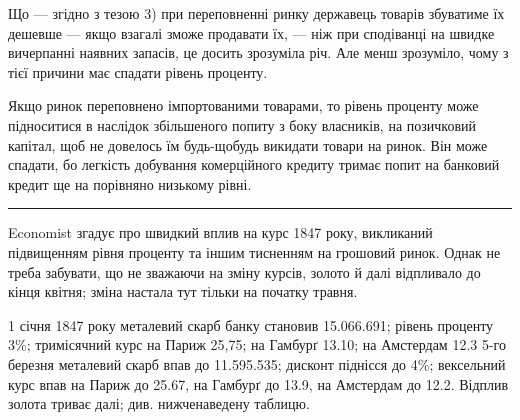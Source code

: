 
Що — згідно з тезою 3) при переповненні ринку державець товарів збуватиме
їх дешевше — якщо взагалі зможе продавати їх, — ніж при сподіванці на
швидке вичерпанні наявних запасів, це досить зрозуміла річ. Але менш зрозуміло,
чому з тієї причини має спадати рівень проценту.

Якщо ринок переповнено імпортованими товарами, то рівень проценту може
підноситися в наслідок збільшеного попиту з боку власників, на позичковий
капітал, щоб не довелось їм будь-щобудь викидати товари на ринок. Він може
спадати, бо легкість добування комерційного кредиту тримає попит на банковий
кредит ще на порівняно низькому рівні.

\pfbreak

Economist згадує про швидкий вплив на курс 1847 року, викликаний
підвищенням рівня проценту та іншим тисненням на грошовий ринок. Однак не
треба забувати, що не зважаючи на зміну курсів, золото й далі відпливало
до кінця квітня; зміна настала тут тільки на початку травня.

1 січня 1847 року металевий скарб банку становив \num{15.066.691};
рівень проценту 3\%; тримісячний курс на Париж 25,75; на Гамбурґ 13.10;
на Амстердам 12.3 5-го березня металевий скарб впав до \num{11.595.535};
дисконт піднісся до 4\%; вексельний курс впав на Париж до 25.67, на Гамбурґ
до 13.9, на Амстердам до 12.2. Відплив золота триває далі; див.
нижченаведену таблицю.

